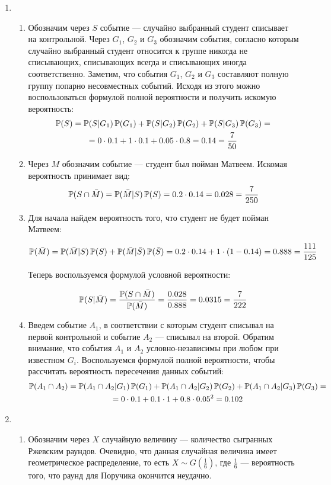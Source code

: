 \begin{enumerate}
	\item
	\begin{enumerate}
		\item Обозначим через $S$ событие — случайно выбранный студент списывает на контрольной. Через $G_{1}$, $G_{2}$ и $G_{3}$ обозначим события, согласно которым случайно выбранный студент относится к группе никогда не списывающих, списывающих всегда и  списывающих иногда соответственно.
		Заметим, что события $G_{1}$, $G_{2}$ и $G_{3}$ составляют полную группу попарно несовместных событий. Исходя из этого можно воспользоваться формулой полной вероятности и получить искомую вероятность:
		\begin{multline*}
		\P(S)=\P(S|G_{1})\P(G_{1})+\P(S|G_{2})\P(G_{2})+\P(S|G_{3})\P(G_{3})=\\
		=0\cdot 0.1+1\cdot 0.1+0.05\cdot 0.8=0.14=\frac{7}{50}
		\end{multline*}
		\item Через $M$ обозначим событие — студент был пойман Матвеем. Искомая вероятность принимает вид:
		\[
		\P(S\cap\bar{M})=\P(\bar{M}|S)\P(S)=0.2\cdot 0.14=0.028=\frac{7}{250}
		\]
		
		\item
		Для начала найдем вероятность того, что студент не будет пойман Матвеем:
		
		\[
		\P(\bar{M})=\P(\bar{M}|S)\P(S)+\P(\bar{M}|\bar{S})\P(\bar{S})=0.2\cdot 0.14+1\cdot (1-0.14)=0.888=\frac{111}{125}
		\]
		
		Теперь воспользуемся формулой условной вероятности:
		
		\[
		\P(S|\bar{M})=\frac{\P(S\cap \bar{M})}{\P(\bar{M})}=\frac{0.028}{0.888}=0.0315=\frac{7}{222}
		\]
		
		\item Введем событие $A_{1}$, в соответствии с которым студент списывал на первой контрольной и событие $A_{2}$ — списывал на второй. Обратим внимание, что события $A_{1}$ и $A_{2}$ условно-независимы при любом при известном $G_i$. Воспользуемся формулой полной вероятности, чтобы рассчитать вероятность пересечения данных событий:
		\begin{multline*}
		\P(A_{1}\cap A_{2})=\P(A_{1}\cap A_{2}|G_{1})\P(G_{1})+\P(A_{1}\cap A_{2}|G_{2})\P(G_{2})+\P(A_{1}\cap A_{2}|G_{3})\P(G_{3})=\\
		= 0\cdot 0.1+0.1\cdot 1+0.8\cdot 0.05^2=0.102
		\end{multline*}
	\end{enumerate}
	
	\item 
	\begin{enumerate}
		\item Обозначим через $X$ случайную величину — количество сыгранных Ржевским раундов. Очевидно, что данная случайная величина имеет геометрическое распределение, то есть $X\sim G(\frac{1}{6})$, где $\frac{1}{6}$ — вероятность того, что раунд для Поручика окончится неудачно.
		

\end{enumerate}
\end{enumerate}
